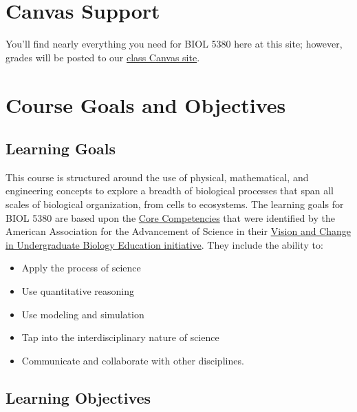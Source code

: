 \documentclass[
]{article}
\begin{document}
\hypertarget{canvas-support}{%
\section{Canvas Support}\label{canvas-support}}

You'll find nearly everything you need for BIOL 5380 here at this site;
however, grades will be posted to our
\href{https://bostoncollege.instructure.com/courses/1615104}{class
Canvas site}.

\hypertarget{course-goals-and-objectives}{%
\section{Course Goals and
Objectives}\label{course-goals-and-objectives}}

\hypertarget{learning-goals}{%
\subsection{Learning Goals}\label{learning-goals}}

This course is structured around the use of physical, mathematical, and
engineering concepts to explore a breadth of biological processes that
span all scales of biological organization, from cells to ecosystems.
The learning goals for BIOL 5380 are based upon the
\href{https://live-visionandchange.pantheonsite.io/wp-content/uploads/2011/03/Revised-Vision-and-Change-Final-Report.pdf}{Core
Competencies} that were identified by the American Association for the
Advancement of Science in their
\href{https://live-visionandchange.pantheonsite.io/about-vc-unpacking-a-movement-2018/}{Vision
and Change in Undergraduate Biology Education initiative}. They include
the ability to:

\begin{itemize}
\item
  Apply the process of science
\item
  Use quantitative reasoning
\item
  Use modeling and simulation
\item
  Tap into the interdisciplinary nature of science
\item
  Communicate and collaborate with other disciplines.
\end{itemize}

\hypertarget{learning-objectives}{%
\subsection{Learning Objectives}\label{learning-objectives}}
\end{document}
